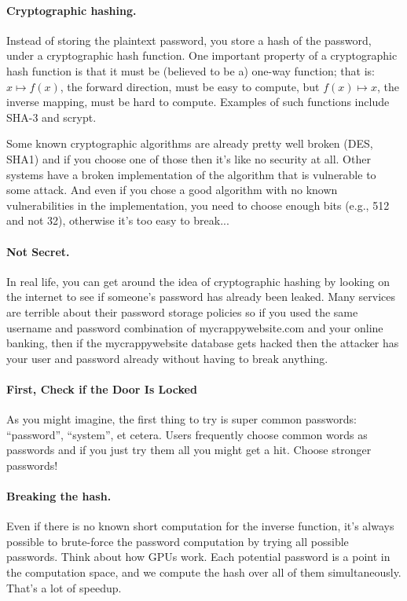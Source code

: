 \documentclass[a4paper]{report}
\begin{document}
\paragraph{Cryptographic hashing.} Instead of storing the plaintext password, you
store a hash of the password, under a cryptographic hash function. One important
property of a cryptographic hash function is that it must be (believed to be a) one-way
function; that is: $x \mapsto f(x)$, the forward direction, must be easy to compute, but
$f(x) \mapsto x$, the inverse mapping, must be hard to compute. Examples of such functions
include SHA-3 and scrypt. 

Some known cryptographic algorithms are already pretty well broken (DES, SHA1) and if you choose one of those then it's like no security at all. Other systems have a broken implementation of the algorithm that is vulnerable to some attack. And even if you chose a good algorithm with no known vulnerabilities in the implementation, you need to choose enough bits (e.g., 512 and not 32), otherwise it's too easy to break...

\paragraph{Not Secret.}
In real life, you can get around the idea of cryptographic hashing by looking on the internet to see if someone's password has already been leaked. Many services are terrible about their password storage policies so if you used the same username and password combination of mycrappywebsite.com and your online banking, then if the mycrappywebsite database gets hacked then the attacker has your user and password already without having to break anything.

\paragraph{First, Check if the Door Is Locked}
As you might imagine, the first thing to try is super common passwords: ``password'', ``system'', et cetera. Users frequently choose common words as passwords and if you just try them all you might get a hit. Choose stronger passwords!

\paragraph{Breaking the hash.} Even if there is no known short computation for the
inverse function, it's always possible to brute-force the password
computation by trying all possible passwords. Think about how GPUs
work. Each potential password is a point in the computation space, and
we compute the hash over all of them simultaneously.  That's a lot of
speedup.
\end{document}
